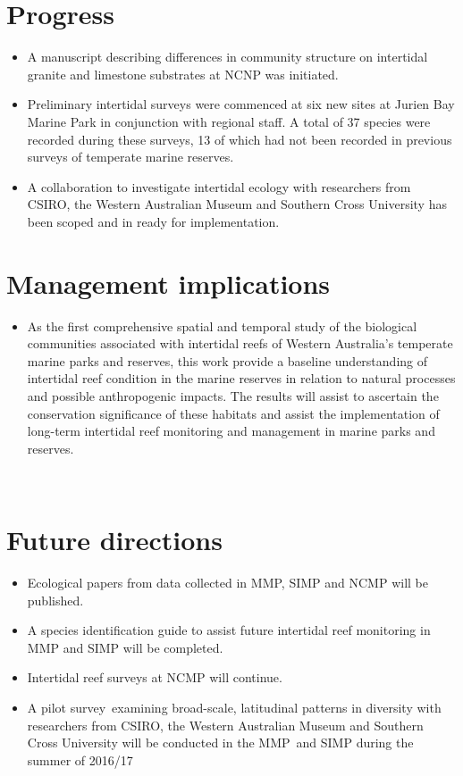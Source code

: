 \documentclass[version=last,
    paper=a4, %
    10pt, %
    usenames,
    dvipsnames,
    oneside, %
    headings=openany, %
    DIV=15 %
]{scrbook}
\begin{document}
\section*{Progress}
\begin{itemize}
\itemsep1pt\parskip0pt
\item
  A manuscript describing differences in community structure on
  intertidal granite and limestone substrates at NCNP was initiated.
\item
  Preliminary intertidal surveys were commenced at six new sites at
  Jurien Bay Marine Park in conjunction with regional staff. A total of
  37 species were recorded during these surveys, 13 of which had not
  been recorded in previous surveys of temperate marine reserves.
\item
  A collaboration to investigate intertidal ecology with researchers
  from CSIRO, the Western Australian Museum and Southern Cross
  University has been scoped and in ready for implementation.
\end{itemize}



\section*{Management implications}
\begin{itemize}
\itemsep1pt\parskip0pt
\item
  As the first comprehensive spatial and temporal study of the
  biological communities associated with intertidal reefs of Western
  Australia's temperate marine parks and reserves, this work provide a
  baseline understanding of intertidal reef condition in the marine
  reserves in relation to natural processes and possible anthropogenic
  impacts. The results will assist to ascertain the conservation
  significance of these habitats and assist the implementation of
  long-term intertidal reef monitoring and management in marine parks
  and reserves.
\end{itemize}

~



\section*{Future directions}
\begin{itemize}
\itemsep1pt\parskip0pt
\item
  Ecological papers from data collected in MMP, SIMP and NCMP will be
  published.
\item
  A species identification guide to assist future intertidal reef
  monitoring in MMP and SIMP will be completed.
\item
  Intertidal reef surveys at NCMP will continue.
\item
  A pilot survey~examining broad-scale, latitudinal patterns in
  diversity with researchers from CSIRO, the Western Australian Museum
  and Southern Cross University will be conducted in the MMP~and SIMP
  during the summer of 2016/17
\end{itemize}



\end{document}
